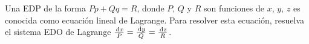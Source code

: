 \question

Una EDP de la forma $Pp+Qq=R$, donde $P$, $Q$ y $R$ son funciones de
$x$, $y$, $z$ es conocida como ecuación lineal de Lagrange.
Para resolver esta ecuación, resuelva el sistema EDO de Lagrange
\begin{math}
	\frac{\dl x}{P}=
	\frac{\dl y}{Q}=
	\frac{\dl z}{R}
\end{math}.
\begin{multicols}{3}
\end{multicols}

